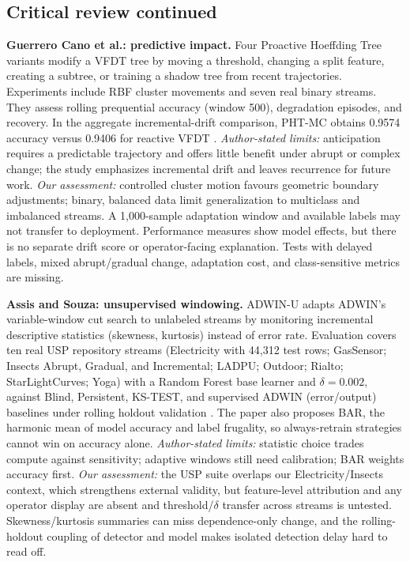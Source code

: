 \documentclass[10pt,a4paper]{article}
\begin{document}
\newpage
\subsection*{Critical review continued}
\textbf{Guerrero Cano et al.: predictive impact.} Four Proactive Hoeffding Tree variants modify a VFDT tree by moving a threshold, changing a split feature, creating a subtree, or training a shadow tree from recent trajectories. Experiments include RBF cluster movements and seven real binary streams. They assess rolling prequential accuracy (window 500), degradation episodes, and recovery. In the aggregate incremental-drift comparison, PHT-MC obtains 0.9574 accuracy versus 0.9406 for reactive VFDT \cite{guerrero}. \emph{Author-stated limits:} anticipation requires a predictable trajectory and offers little benefit under abrupt or complex change; the study emphasizes incremental drift and leaves recurrence for future work. \emph{Our assessment:} controlled cluster motion favours geometric boundary adjustments; binary, balanced data limit generalization to multiclass and imbalanced streams. A 1,000-sample adaptation window and available labels may not transfer to deployment. Performance measures show model effects, but there is no separate drift score or operator-facing explanation. Tests with delayed labels, mixed abrupt/gradual change, adaptation cost, and class-sensitive metrics are missing.

\textbf{Assis and Souza: unsupervised windowing.} ADWIN-U adapts ADWIN's variable-window cut search to unlabeled streams by monitoring incremental descriptive statistics (skewness, kurtosis) instead of error rate. Evaluation covers ten real USP repository streams (Electricity with 44,312 test rows; GasSensor; Insects Abrupt, Gradual, and Incremental; LADPU; Outdoor; Rialto; StarLightCurves; Yoga) with a Random Forest base learner and $\delta=0.002$, against Blind, Persistent, KS-TEST, and supervised ADWIN (error/output) baselines under rolling holdout validation \cite{assisu}. The paper also proposes BAR, the harmonic mean of model accuracy and label frugality, so always-retrain strategies cannot win on accuracy alone. \emph{Author-stated limits:} statistic choice trades compute against sensitivity; adaptive windows still need calibration; BAR weights accuracy first. \emph{Our assessment:} the USP suite overlaps our Electricity/Insects context, which strengthens external validity, but feature-level attribution and any operator display are absent and threshold/$\delta$ transfer across streams is untested. Skewness/kurtosis summaries can miss dependence-only change, and the rolling-holdout coupling of detector and model makes isolated detection delay hard to read off.
\end{document}
